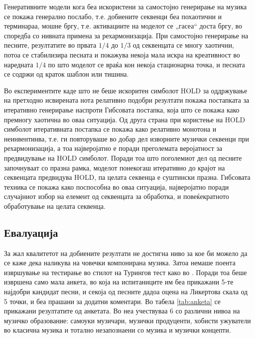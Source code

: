 Генеративните модели кога беа искористени за самостојно генерирање на музика се покажа генерално послабо, т.е. добиените секвенци беа похаотични и терминараа, мошне бргу, т.е. активациите на моделот се „гасеа“ доста бргу, во споредба со нивната примена за рехармонизација. При самостојно генерирање на песните, резултатите во првата $1/4$ до $1/3$ од секвенцата се многу хаотични, потоа се стабилизира песната и покажува некоја мала искра на креативност во наредната $1/4$ по што моделот се враќа кон некоја стационарна точка, и песната се содржи од краток шаблон или тишина.

Во експериментите каде што не беше искоритен симболот HOLD за оддржување на претходно исвирената нота релативно подобри резултати покажа постапката за итеративно генерирање наспроти Гибсовата постапка, која што се покажа како премногу хаотична во оваа ситуација. Од друга страна при користење на HOLD симболот итеративната постапка се покажа како релативно монотона и неинвентинва, т.е. ги повторуваше во добар дел изворните музички секвенци при рехармонизација, а тоа најверојатно е поради преголемата веројатност за предвидување на HOLD симболот. Поради тоа што поголемиот дел од песните започнуваат со празна рамка, моделот понекогаш итеративно до крајот на секвенцата предвидува HOLD, па целата секвенца е суштински празна. Гибсовата техника се покажа како поспособна во оваа ситуација, најверојатно поради случајниот избор на елемент од секвенцата за обработка, и повеќекратното обработување на целата секвенца. 

\subsection{Евалуација}

За жал квалитетот на добиените резултати не достигна ниво за кое би можело да се каже дека наликува на човечки компонирана музика. Затоа немаше поента извршување на тестирање во стилот на Турингов тест како во \cite{Hadjeres2016,Liang2017,Yang2017}. Поради тоа беше извршена само мала анкета, во која на испитаниците им беа прикажани 5-те најдобри кандидат песни, и секоја од песните дадоа оцена на Ликертова скала од 5 точки, и беа прашани за додатни коментари. Во табела \ref{tab:anketa} се прикажани резултатите од анкетата. Во неа учествуваа 6 со различни нивоа на музичко образование: самоуки музичари, музички продуценти, хобисти ужуватели во класична музика и тотално незапознаени со музика и музички концепти. 

